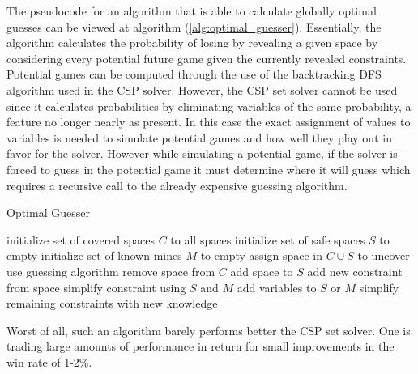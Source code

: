 \documentclass[letterpaper]{article}
\begin{document}
The pseudocode for an algorithm that is able to calculate globally optimal guesses can be viewed at algorithm (\ref{alg:optimal_guesser}).  Essentially, the algorithm calculates the probability of losing by revealing a given space by considering every potential future game given the currently revealed constraints.  Potential games can be computed through the use of the backtracking DFS algorithm used in the CSP solver.  However, the CSP set solver cannot be used since it calculates probabilities by eliminating variables of the same probability, a feature no longer nearly as present.  In this case the exact assignment of values to variables is needed to simulate potential games and how well they play out in favor for the solver.  However while simulating a potential game, if the solver is forced to guess in the potential game it must determine where it will guess which requires a recursive call to the already expensive guessing algorithm.

\begin{algorithm}[t]
\caption{Optimal Guesser}
\label{alg:optimal_guesser}
\begin{algorithmic}
\STATE initialize set of covered spaces $C$ to all spaces
\STATE initialize set of safe spaces $S$ to empty
\STATE initialize set of known mines $M$ to empty
		\STATE assign space in $C \cup S$ to uncover
	\ELSE
		\STATE use guessing algorithm
	\ENDIF
		\STATE remove space from $C$
		\STATE add space to $S$
		\STATE add new constraint from space
		\STATE simplify constraint using $S$ and $M$
			\STATE add variables to $S$ or $M$
		\ENDIF
		\STATE simplify remaining constraints with new knowledge
	\ENDIF
\ENDWHILE
\end{algorithmic}
\end{algorithm}

Worst of all, such an algorithm barely performs better the CSP set solver.  One is trading large amounts of performance in return for small improvements in the win rate of 1-2\%.
\end{document}
